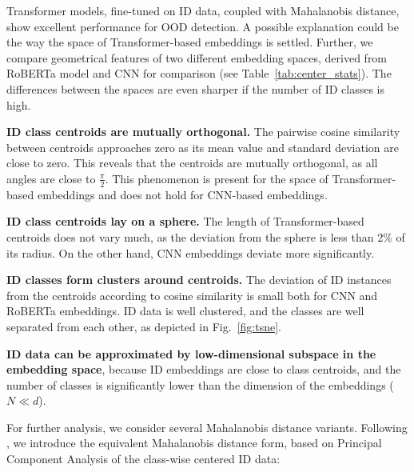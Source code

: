 \documentclass[letterpaper, final]{article} %
\begin{document}
Transformer models, fine-tuned on ID data, coupled with Mahalanobis distance, show excellent performance for OOD detection. A possible explanation could be the way the space of Transformer-based embeddings is settled. Further, we compare geometrical features of two different embedding spaces, derived from RoBERTa model and CNN for comparison (see Table~\ref{tab:center_stats}). The differences between the spaces are even sharper if the number of ID classes is high.


{\bf ID class centroids are mutually orthogonal.}  The pairwise cosine similarity between centroids approaches zero as its mean value and standard deviation are close to zero. This reveals that the centroids are mutually orthogonal, as all angles are close to $\frac{\pi}2$. This phenomenon is present for the space of Transformer-based embeddings and does not hold for CNN-based embeddings.

{\bf ID class centroids lay on a sphere.} The length of Transformer-based centroids  does not vary much, as the deviation from the sphere is less than 2\% of its radius. On the other hand, CNN embeddings deviate more significantly.

{\bf ID classes form clusters around centroids.} The deviation of ID instances from the centroids according to cosine similarity is small both for CNN and RoBERTa embeddings. ID data is well clustered, and the classes are well separated from each other, as depicted in Fig.~\ref{fig:tsne}.


{\bf ID data can be approximated by low-dimensional subspace in the embedding space}, because ID embeddings are close to class centroids, and the number of classes is significantly lower than the dimension of the embeddings ($N \ll d$).

For further analysis, we consider several Mahalanobis distance variants. Following \citet*{Kamoi2020WhyIT}, we introduce the equivalent Mahalanobis distance form, based on  Principal Component Analysis of the class-wise centered ID data:

\end{document}

